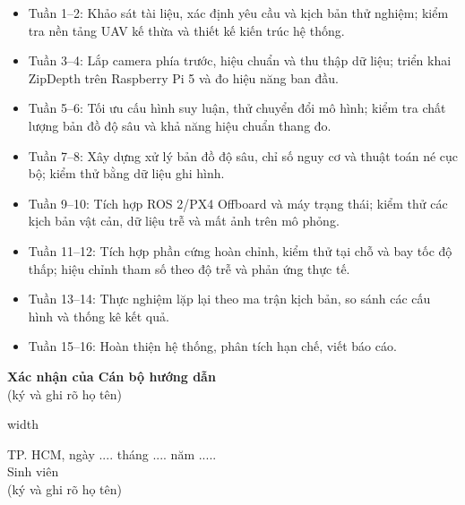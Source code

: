 \begin{mdframed}[style=decuongfield]
\begin{itemize}
\item Tuần 1--2: Khảo sát tài liệu, xác định yêu cầu và kịch bản thử nghiệm; kiểm tra nền tảng UAV kế thừa và thiết kế kiến trúc hệ thống.
\item Tuần 3--4: Lắp camera phía trước, hiệu chuẩn và thu thập dữ liệu; triển khai ZipDepth trên Raspberry Pi 5 và đo hiệu năng ban đầu.
\item Tuần 5--6: Tối ưu cấu hình suy luận, thử chuyển đổi mô hình; kiểm tra chất lượng bản đồ độ sâu và khả năng hiệu chuẩn thang đo.
\item Tuần 7--8: Xây dựng xử lý bản đồ độ sâu, chỉ số nguy cơ và thuật toán né cục bộ; kiểm thử bằng dữ liệu ghi hình.
\item Tuần 9--10: Tích hợp ROS 2/PX4 Offboard và máy trạng thái; kiểm thử các kịch bản vật cản, dữ liệu trễ và mất ảnh trên mô phỏng.
\item Tuần 11--12: Tích hợp phần cứng hoàn chỉnh, kiểm thử tại chỗ và bay tốc độ thấp; hiệu chỉnh tham số theo độ trễ và phản ứng thực tế.
\item Tuần 13--14: Thực nghiệm lặp lại theo ma trận kịch bản, so sánh các cấu hình và thống kê kết quả.
\item Tuần 15--16: Hoàn thiện hệ thống, phân tích hạn chế, viết báo cáo.
\end{itemize}
\par\vspace{1mm}
\noindent\makebox[\linewidth][l]{\hspace*{-2.5mm}\rule{\dimexpr\linewidth+5mm\relax}{0.4pt}}\par
\vspace{2mm}

\vspace{3mm}
\noindent
  \begin{minipage}[c][35mm][t]{\dimexpr0.5\linewidth-\arrayrulewidth\relax}
    \vspace{4mm}\centering
    \textbf{Xác nhận của Cán bộ hướng dẫn}\\
    (ký và ghi rõ họ tên)
  \end{minipage}%
  \vrule width\arrayrulewidth
  \begin{minipage}[c][35mm][t]{\dimexpr0.5\linewidth-2\arrayrulewidth\relax}
    \vspace{4mm}\centering
    {\fontsize{11}{15}\selectfont TP. HCM, ngày .... tháng .... năm ..... }\\
    Sinh viên\\
    (ký và ghi rõ họ tên)
  \end{minipage}%

\end{mdframed}
\par
\clearpage
\endgroup
\restoregeometry
